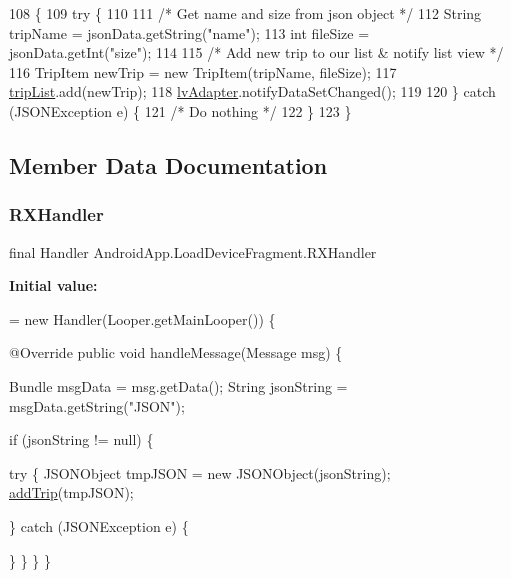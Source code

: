 \begin{DoxyCode}
108                                                     \{
109         \textcolor{keywordflow}{try} \{
110 
111             \textcolor{comment}{/* Get name and size from json object */}
112             String tripName = jsonData.getString(\textcolor{stringliteral}{"name"});
113             \textcolor{keywordtype}{int} fileSize = jsonData.getInt(\textcolor{stringliteral}{"size"});
114 
115             \textcolor{comment}{/* Add new trip to our list & notify list view */}
116             TripItem newTrip = \textcolor{keyword}{new} TripItem(tripName, fileSize);
117             \hyperlink{class_android_app_1_1_load_device_fragment_a23e4856334c9782e15f7f7a08b544f4c}{tripList}.add(newTrip);
118             \hyperlink{class_android_app_1_1_load_device_fragment_a96c2356cc65e934741c31ff3839ed9d3}{lvAdapter}.notifyDataSetChanged();
119 
120         \} \textcolor{keywordflow}{catch} (JSONException e) \{
121             \textcolor{comment}{/* Do nothing */}
122         \}
123     \}
\end{DoxyCode}


\subsection{Member Data Documentation}
\mbox{\label{class_android_app_1_1_load_device_fragment_ad37565ea5a5332faf0c6b12284ca4e6c}} 
\subsubsection{\texorpdfstring{R\+X\+Handler}{RXHandler}}
{\footnotesize\ttfamily final Handler Android\+App.\+Load\+Device\+Fragment.\+R\+X\+Handler}

{\bfseries Initial value\+:}
\begin{DoxyCode}
= \textcolor{keyword}{new} Handler(Looper.getMainLooper()) \{

        
        @Override
        \textcolor{keyword}{public} \textcolor{keywordtype}{void} handleMessage(Message msg) \{

            Bundle msgData = msg.getData();
            String jsonString = msgData.getString(\textcolor{stringliteral}{"JSON"});

            \textcolor{keywordflow}{if} (jsonString != null) \{

                
                \textcolor{keywordflow}{try} \{
                    JSONObject tmpJSON = \textcolor{keyword}{new} JSONObject(jsonString);
                    \hyperlink{class_android_app_1_1_load_device_fragment_a182949dc35ed68974acf64e20cdc6f20}{addTrip}(tmpJSON);

                \} \textcolor{keywordflow}{catch} (JSONException e) \{
                    
                \}
            \}
        \}
    \}
\end{DoxyCode}


